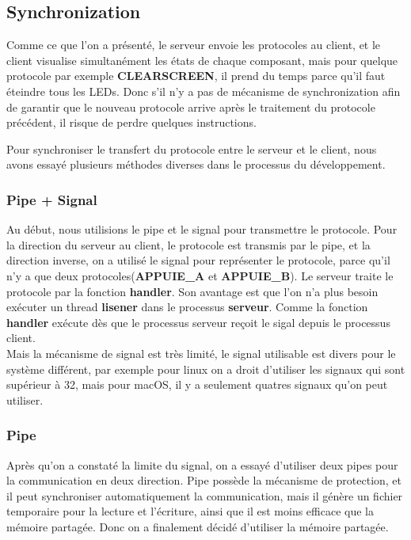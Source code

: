 \documentclass[14px]{article}
\begin{document}
\subsection{Synchronization}
Comme ce que l'on a présenté, le serveur envoie les protocoles au client, et le client visualise simultanément les états de chaque composant, mais pour quelque protocole par exemple \textbf{CLEARSCREEN}, il prend du temps parce qu'il faut éteindre tous les LEDs. Donc s'il n'y a pas de mécanisme de synchronization afin de garantir que le nouveau protocole arrive après le traitement du protocole précédent, il risque de perdre quelques instructions.

Pour synchroniser le transfert du protocole entre le serveur et le client, nous avons essayé plusieurs méthodes diverses dans le processus du développement.


\subsubsection{Pipe + Signal}
Au début, nous utilisions le pipe et le signal pour transmettre le protocole. Pour la direction du serveur au client, le protocole est transmis par le pipe, et la direction inverse, on a utilisé le signal pour représenter le protocole, parce qu'il n'y a que deux protocoles(\textbf{APPUIE\_A} et \textbf{APPUIE\_B}). Le serveur traite le protocole par la fonction \textbf{handler}.
Son avantage est que l'on n'a plus besoin exécuter un thread \textbf{lisener} dans le processus \textbf{serveur}. Comme la fonction \textbf{handler} exécute dès que le processus serveur reçoit le sigal depuis le processus client. \\
Mais la mécanisme de signal est très limité, le signal utilisable est divers pour le système différent, par exemple pour linux on a droit d'utiliser les signaux qui sont supérieur à 32, mais pour macOS, il y a seulement quatres signaux qu'on peut utiliser.

\subsubsection{Pipe}
Après qu'on a constaté la limite du signal, on a essayé d'utiliser deux pipes pour la communication en deux direction. Pipe possède la mécanisme de protection, et il peut  synchroniser automatiquement la communication, mais il génère un fichier temporaire pour la lecture et l'écriture, ainsi que il est moins efficace que la mémoire partagée. Donc on a finalement décidé d'utiliser la mémoire partagée.
\end{document}
